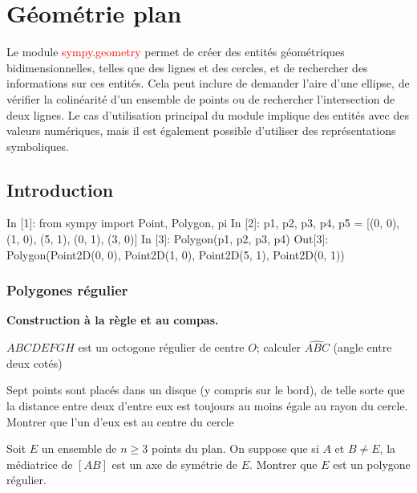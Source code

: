 \chapter{Géométrie plan}
Le module \textcolor{red}{sympy.geometry} permet de créer des entités géométriques bidimensionnelles, telles que des lignes et des cercles, et de rechercher des informations sur ces entités. Cela peut inclure de demander l’aire d’une ellipse, de vérifier la colinéarité d’un ensemble de points ou de rechercher l’intersection de deux lignes. Le cas d'utilisation principal du module implique des entités avec des valeurs numériques, mais il est également possible d'utiliser des représentations symboliques.

\section{Introduction}

\begin{python}
In [1]: from sympy import Point, Polygon, pi
In [2]: p1, p2, p3, p4, p5 = [(0, 0), (1, 0), (5, 1), (0, 1), (3, 0)]
In [3]: Polygon(p1, p2, p3, p4)
Out[3]: Polygon(Point2D(0, 0), Point2D(1, 0), Point2D(5, 1), Point2D(0, 1))
\end{python}

\subsection{Polygones régulier}

\begin{definition}
\end{definition}

\textbf{Construction à la règle et au compas.}
\\
\begin{example}
$ABCDEFGH$ est un octogone régulier de centre $O$; calculer $\widehat{ABC}$ (angle entre deux cotés)
\end{example}

\begin{example}
Sept points sont placés dans un disque (y compris sur le bord), de telle sorte que la
distance entre deux d’entre eux est toujours au moins égale au rayon du cercle. Montrer que
l’un d’eux est au centre du cercle
\end{example}

\begin{exercise}
Soit $E$ un ensemble de $n \geq 3$ points du plan. On suppose que si $A$ et $B \neq E$, la médiatrice
de $\left[AB\right]$ est un axe de symétrie de $E$. Montrer que $E$ est un polygone régulier.
\end{exercise}

